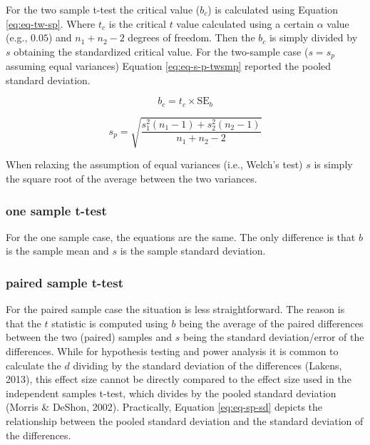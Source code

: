 \documentclass[
  man]{apa7}
\begin{document}
For the two sample t-test the critical value (\(b_c\)) is calculated using Equation \eqref{eq:eq-tw-sp}. Where \(t_c\) is the critical \(t\) value calculated using a certain \(\alpha\) value (e.g., \(0.05\)) and \(n_1 + n_2 - 2\) degrees of freedom. Then the \(b_c\) is simply divided by \(s\) obtaining the standardized critical value. For the two-sample case (\(s = s_p\) assuming equal variances) Equation \eqref{eq:eq-s-p-twsmp} reported the pooled standard deviation.

\begin{equation}
    \label{eq:eq-tw-sp}
    b_c = t_c \times \text{SE}_{b}
\end{equation}

\begin{equation}
    \label{eq:eq-s-p-twsmp}
    s_p = \sqrt{\frac{s_1^2 (n_1 - 1) + s_2^2 (n_2 - 1)}{n_1 + n_2 - 2}}
\end{equation}

When relaxing the assumption of equal variances (i.e., Welch's test) \(s\) is simply the square root of the average between the two variances.

\hypertarget{one-sample-t-test}{%
\subsubsection{one sample t-test}\label{one-sample-t-test}}

For the one sample case, the equations are the same. The only difference is that \(b\) is the sample mean and \(s\) is the sample standard deviation.

\hypertarget{paired-sample-t-test}{%
\subsubsection{paired sample t-test}\label{paired-sample-t-test}}

For the paired sample case the situation is less straightforward. The reason is that the \(t\) statistic is computed using \(b\) being the average of the paired differences between the two (paired) samples and \(s\) being the standard deviation/error of the differences. While for hypothesis testing and power analysis it is common to calculate the \(d\) dividing by the standard deviation of the differences (Lakens, 2013), this effect size cannot be directly compared to the effect size used in the independent samples t-test, which divides by the pooled standard deviation (Morris \& DeShon, 2002). Practically, Equation \eqref{eq:eq-sp-sd} depicts the relationship between the pooled standard deviation and the standard deviation of the differences.
\end{document}
